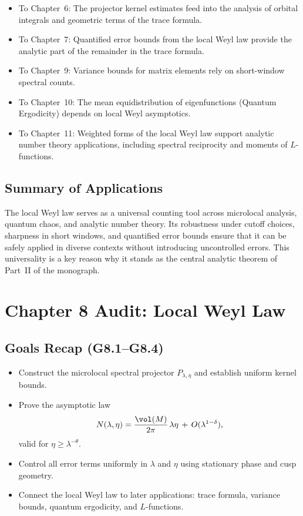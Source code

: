 \begin{itemize}
  \item To Chapter~6: The projector kernel estimates feed into the analysis of orbital integrals and geometric terms of the trace formula.
  \item To Chapter~7: Quantified error bounds from the local Weyl law provide the analytic part of the remainder in the trace formula.
  \item To Chapter~9: Variance bounds for matrix elements rely on short-window spectral counts.
  \item To Chapter~10: The mean equidistribution of eigenfunctions (Quantum Ergodicity) depends on local Weyl asymptotics.
  \item To Chapter~11: Weighted forms of the local Weyl law support analytic number theory applications, including spectral reciprocity and moments of $L$-functions.
\end{itemize}

\subsection{Summary of Applications}

The local Weyl law serves as a universal counting tool across microlocal analysis, quantum chaos, and analytic number theory.  
Its robustness under cutoff choices, sharpness in short windows, and quantified error bounds ensure that it can be safely applied in diverse contexts without introducing uncontrolled errors.  
This universality is a key reason why it stands as the central analytic theorem of Part~II of the monograph.


\section*{Chapter 8 Audit: Local Weyl Law}

\subsection*{Goals Recap (G8.1–G8.4)}
\begin{itemize}
  \item[(G8.1)] Construct the microlocal spectral projector $P_{\lambda,\eta}$ and establish uniform kernel bounds.
  \item[(G8.2)] Prove the asymptotic law
  \[
    N(\lambda,\eta) = \frac{\vol(M)}{2\pi}\,\lambda\eta \,+\, O(\lambda^{1-\delta}),
  \]
  valid for $\eta \geq \lambda^{-\theta}$.
  \item[(G8.3)] Control all error terms uniformly in $\lambda$ and $\eta$ using stationary phase and cusp geometry.
  \item[(G8.4)] Connect the local Weyl law to later applications: trace formula, variance bounds, quantum ergodicity, and $L$-functions.
\end{itemize}

